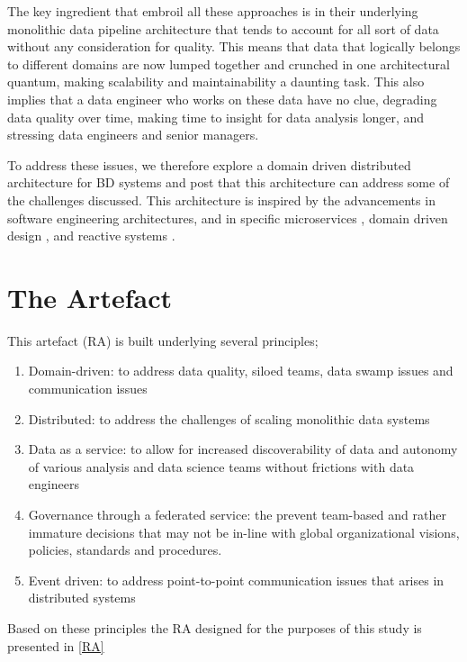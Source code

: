 \documentclass[runningheads]{llncs}
\begin{document}
The key ingredient that embroil all these approaches is in their underlying monolithic data pipeline architecture that tends to account for all sort of data without any consideration for quality. This means that data that logically belongs to different domains are now lumped together and crunched in one architectural quantum, making scalability and maintainability a daunting task. This also implies that a data engineer who works on these data have no clue, degrading data quality over time, making time to insight for data analysis longer, and stressing data engineers and senior managers.

To address these issues, we therefore explore a domain driven distributed architecture for BD systems and post that this architecture can address some of the challenges discussed. This architecture is inspired by the advancements in software engineering architectures, and in specific microservices \cite{bellemare2020building}, domain driven design \cite{evans2004domain}, and reactive systems \cite{aceto2007reactive}. 

\section*{The Artefact}

This artefact (RA) is built underlying several principles; 

\begin{enumerate}
    \item Domain-driven: to address data quality, siloed teams, data swamp issues and communication issues
    \item Distributed: to address the challenges of scaling monolithic data systems 
    \item Data as a service: to allow for increased discoverability of data and autonomy of various analysis and data science teams without frictions with data engineers
    \item Governance through a federated service: the prevent team-based and rather immature decisions that may not be in-line with global organizational visions, policies, standards and procedures. 
    \item Event driven: to address point-to-point communication issues that arises in distributed systems 
\end{enumerate}

Based on these principles the RA designed for the purposes of this study is presented in \ref{RA}
\end{document}
